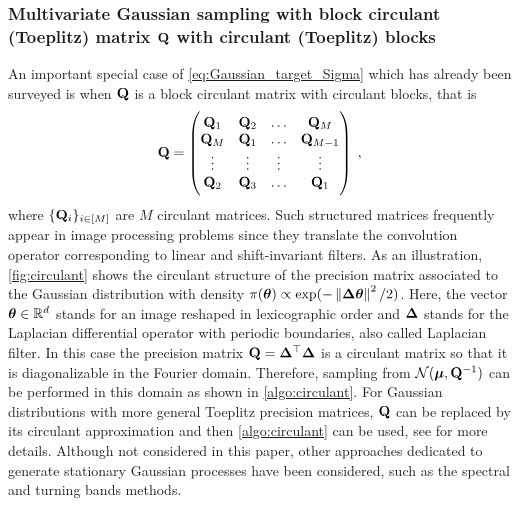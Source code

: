 \documentclass[nohypdvips,onefignum,onetabnum]{siamart171218}
\begin{document}
\subsubsection{Multivariate Gaussian sampling with block circulant (Toeplitz) matrix $\mathbf{Q}$ with circulant (Toeplitz) blocks} 
An important special case of \cref{eq:Gaussian_target_Sigma} which has already been surveyed \cite{Rue2005} is when $\mathbf{Q}$ is a block circulant matrix with circulant blocks, that is
\begin{equation}
  \mathbf{Q} = \begin{pmatrix}
          \mathbf{Q}_1 & \mathbf{Q}_2 & \hdots & \mathbf{Q}_M \\
          \mathbf{Q}_M & \mathbf{Q}_1 & \hdots & \mathbf{Q}_{M-1} \\
          \vdots & \vdots & \vdots & \vdots \\
          \mathbf{Q}_2 & \mathbf{Q}_{3} & \hdots & \mathbf{Q}_1
          \end{pmatrix}\;,
\end{equation}
where $\{\mathbf{Q}_{i}\}_{i \in [M]}$ are $M$ circulant matrices. 
Such structured matrices frequently appear in image processing problems since they translate the convolution operator corresponding to linear and shift-invariant filters.
As an illustration, \cref{fig:circulant} shows the circulant structure of the precision matrix associated to the Gaussian distribution with density $\pi(\boldsymbol{\theta}) \propto \exp(-\left\|\mathbf{\Delta}\boldsymbol{\theta}\right\|^2/2)$.
Here, the vector $\boldsymbol{\theta} \in \mathbb{R}^d$ stands for an image reshaped in lexicographic order and $\mathbf{\Delta}$ stands for the Laplacian differential operator with periodic boundaries, also called Laplacian filter. In this case the precision matrix $\mathbf{Q} = \mathbf{\Delta}^{\top}\mathbf{\Delta}$ is a circulant matrix \cite{Orieux2010} so that it is diagonalizable in the Fourier domain. Therefore, sampling from $\mathcal{N}(\boldsymbol{\mu},\mathbf{Q}^{-1})$ can be performed in this domain as shown in \cref{algo:circulant}. 
For Gaussian distributions with more general Toeplitz precision matrices, $\mathbf{Q}$ can be replaced by its circulant approximation and then \cref{algo:circulant} can be used, see \cite{Rue2005} for more details.
Although not considered in this paper, other approaches dedicated to generate stationary Gaussian processes \cite{Li2009} have been considered, such as the spectral \cite{Shinozuka1972,Mejia1974} and turning bands \cite{Mantoglou1982} methods.
\end{document}
